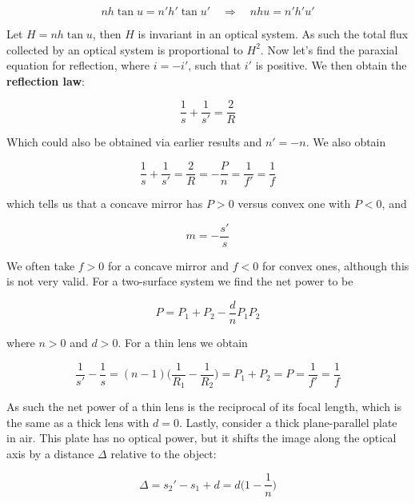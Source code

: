 \documentclass[a4paper]{article}
\begin{document}
\begin{equation}
    nh\tan u=n'h'\tan u'\quad\Rightarrow\quad nhu=n'h'u'
\end{equation}

Let $H=nh\tan u$, then $H$ is invariant in an optical system. As such the total flux collected by an optical system is proportional to $H^2$. Now let's find the paraxial equation for reflection, where $i=-i'$, such that $i'$ is positive. We then obtain the \textbf{reflection law}:

\begin{equation}
    \frac{1}{s}+\frac{1}{s'}=\frac{2}{R}
\end{equation}

Which could also be obtained via earlier results and $n'=-n$. We also obtain 

\begin{equation}
    \frac{1}{s}+\frac{1}{s'}=\frac{2}{R}=-\frac{P}{n}=\frac{1}{f'}=\frac{1}{f}
\end{equation}

which tells us that a concave mirror has $P>0$ versus convex one with $P<0$, and

\begin{equation}
    m=-\frac{s'}{s}
\end{equation}

We often take $f>0$ for a concave mirror and $f<0$ for convex ones, although this is not very valid. For a two-surface system we find the net power to be

\begin{equation}
    P=P_1+P_2-\frac{d}{n}P_1P_2
\end{equation}

where $n>0$ and $d>0$. For a thin lens we obtain

\begin{equation}
    \frac{1}{s'}-\frac{1}{s}=(n-1)\bigg(\frac{1}{R_1}-\frac{1}{R_2}\bigg)=P_1+P_2=P=\frac{1}{f'}=\frac{1}{f}
\end{equation}

As such the net power of a thin lens is the reciprocal of its focal length, which is the same as a thick lens with $d=0$. Lastly, consider a thick plane-parallel plate in air. This plate has no optical power, but it shifts the image along the optical axis by a distance $\Delta$ relative to the object:

\begin{equation}
    \Delta = s_2'-s_1+d=d\bigg(1-\frac{1}{n}\bigg)
\end{equation}
\end{document}
